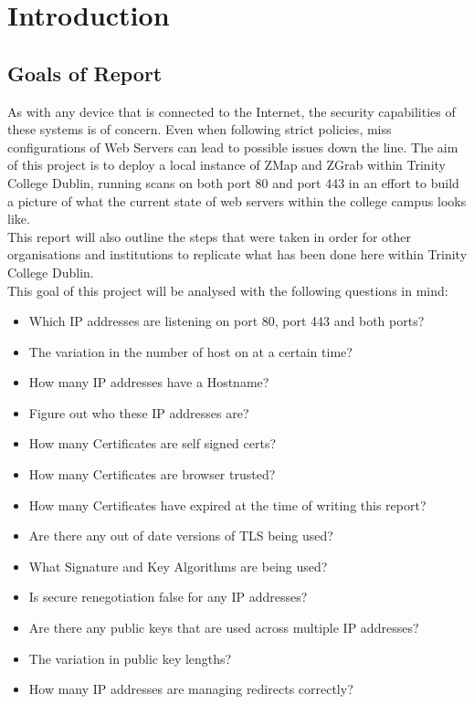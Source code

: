 \documentclass[a4wide,leqno,12pt]{report}
\begin{document}
\chapter{Introduction}
\section{Goals of Report}
As with any device that is connected to the Internet, the  security capabilities of these systems is of concern. Even when following strict policies,  miss configurations of Web Servers can lead to possible issues down the line. The aim of this project is to deploy a local instance of ZMap and ZGrab within Trinity College Dublin, running scans on both port 80 and port 443 in an effort to build a picture of what the current state of web servers within the college campus looks like.\\

This report  will also outline the steps that were taken in order for other organisations and institutions to replicate what has been done here within Trinity College Dublin.\\


This goal of this project will be analysed with the following questions in mind:
\begin{itemize}
  \item Which IP addresses are listening on port 80, port 443 and both ports?
  \item The variation in the number of host on at a certain time?
  \item How many IP addresses have a Hostname?
  \item Figure out who these IP addresses are?
  \item How many Certificates are self signed certs?
  \item How many Certificates are browser trusted?
   \item How many Certificates have expired at the time of writing this report?
  \item Are there any out of date versions of TLS being used?
  \item What Signature and Key Algorithms are being used?
  \item Is secure renegotiation false for any IP addresses?
  \item Are there any public keys that are used across multiple IP addresses?
  \item The variation in public key lengths?
  \item How many IP addresses are managing redirects correctly?
 
\end{itemize}
\end{document}
